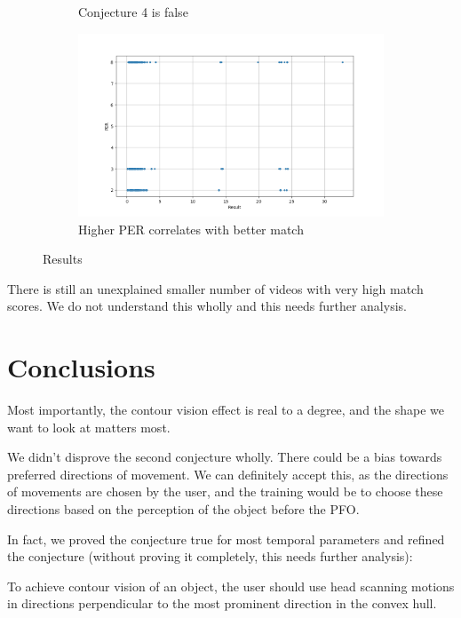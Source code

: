 \documentclass[]{article}
\begin{document}
\begin{figure}[h]
\begin{subfigure}{0.45\textwidth}
		\caption{Conjecture 4 is false}
		\label{graphs:conj4}
	\end{subfigure}
	\hfill
	\begin{subfigure}{0.45\textwidth}
		\centering
		\includegraphics[width=\textwidth]{QueryPER.png}
		\caption{Higher PER correlates with better match}
		\label{graphs:PER}
	\end{subfigure}
	\caption{Results}
	\label{fig:results_graphs}
\end{figure}
There is still an unexplained smaller number of videos with very high match scores. We do not understand this wholly and this needs further analysis. 

\section{Conclusions}
Most importantly, the contour vision effect is real to a degree, and the shape we want to look at matters most. 

We didn't disprove the second conjecture wholly. There could be a bias towards preferred directions of movement. We can definitely accept this, as the directions of movements are chosen by the user, and the training would be to choose these directions based on the perception of the object before the PFO.

In fact, we proved the conjecture true for most temporal parameters and refined the conjecture (without proving it completely, this needs further analysis):

\begin{conjecture}
To achieve contour vision of an object, the user should use head scanning motions in directions perpendicular to the most prominent direction in the convex hull.
\end{conjecture}



\end{document}

